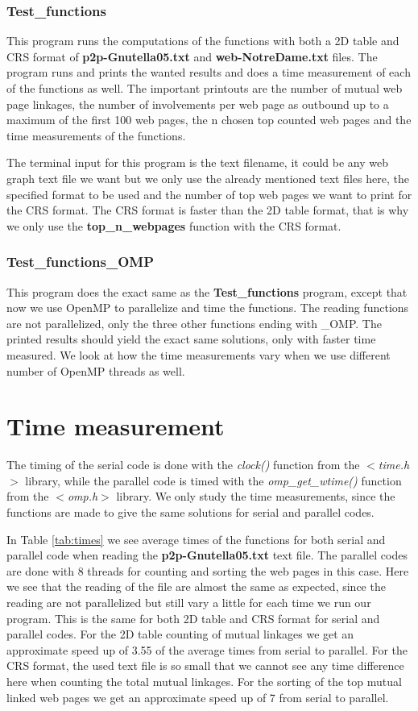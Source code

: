 \documentclass[12pt,a4paper,english]{article}
\begin{document}
\subsubsection{Test\_functions}
This program runs the computations of the functions with both a 2D table and CRS format of \textbf{p2p-Gnutella05.txt} and \textbf{web-NotreDame.txt} files. The program runs and prints the wanted results and does a time measurement of each of the functions as well. The important printouts are the number of mutual web page linkages, the number of involvements per web page as outbound up to a maximum of the first 100 web pages, the n chosen top counted web pages and the time measurements of the functions.

The terminal input for this program is the text filename, it could be any web graph text file we want but we only use the already mentioned text files here, the specified format to be used and the number of top web pages we want to print for the CRS format. The CRS format is faster than the 2D table format, that is why we only use the \textbf{top\_n\_webpages} function with the CRS format.

\subsubsection{Test\_functions\_OMP}
This program does the exact same as the \textbf{Test\_functions} program, except that now we use OpenMP to parallelize and time the functions. The reading functions are not parallelized, only the three other functions ending with \_OMP. The printed results should yield the exact same solutions, only with faster time measured. We look at how the time measurements vary when we use different number of OpenMP threads as well. 

\section{Time measurement}
\label{sect:Time}
The timing of the serial code is done with the \textit{clock()} function from the \textit{$<$time.h$>$} library, while the parallel code is timed with the \textit{omp\_get\_wtime()} function from the \textit{$<$omp.h$>$} library. We only study the time measurements, since the functions are made to give the same solutions for serial and parallel codes.

In Table \ref{tab:times} we see average times of the functions for both serial and parallel code when reading the \textbf{p2p-Gnutella05.txt} text file. The parallel codes are done with 8 threads for counting and sorting the web pages in this case. Here we see that the reading of the file are almost the same as expected, since the reading are not parallelized but still vary a little for each time we run our program. This is the same for both 2D table and CRS format for serial and parallel codes. For the 2D table counting of mutual linkages we get an approximate speed up of 3.55 of the average times from serial to parallel. For the CRS format, the used text file is so small that we cannot see any time difference here when counting the total mutual linkages. For the sorting of the top mutual linked web pages we get an approximate speed up of 7 from serial to parallel.
\end{document}
